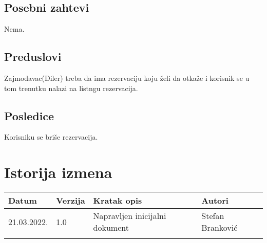 \documentclass[12pt]{article}
\begin{document}
\subsection{Posebni zahtevi}
Nema.
\subsection{Preduslovi}
Zajmodavac(Điler) treba da ima rezervaciju koju želi da otkaže i korisnik se u tom trenutku nalazi na listngu rezervacija.
\subsection{Posledice}
Korisniku se briše rezervacija.
\section{Istorija izmena}
\begin{center}
\begin{tabular}{ | m{2cm} | m{1.5cm}| m{6cm} | m{5cm} | } 
\hline
Datum & Verzija & Kratak opis & Autori \\ 
\hline
 21.03.2022. & 1.0 & Napravljen inicijalni dokument & Stefan Branković\\ 
\hline
&&&\\ 
\hline
\end{tabular}
\end{center}
\end{document}
